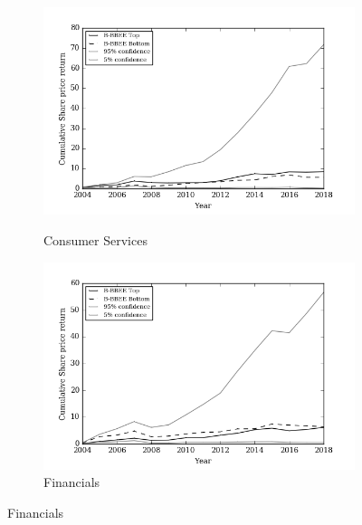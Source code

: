 \begin{figure}[!h]
    \begin{subfigure}{\textwidth}
      \centering
      \includegraphics[width=.8\linewidth]{"Images/Bootstrap_Consumer Services_Cumulative"}
      {\small {\it \caption{Consumer Services}}}
    \end{subfigure}
    \begin{subfigure}{\textwidth}
      \centering
      \includegraphics[width=.8\linewidth]{"Images/Bootstrap_Financials_Cumulative"}
      {\small {\caption{Financials }}}
    \end{subfigure}
\end{figure}

